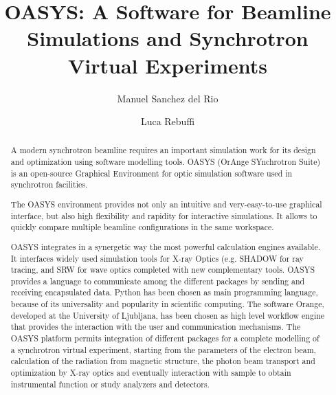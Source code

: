 \documentclass{aip-cp}
\begin{document}
\title{OASYS: A Software for Beamline Simulations and Synchrotron Virtual Experiments}

\author[aff1]{Manuel Sanchez del Rio} %
\author[aff2]{Luca Rebuffi}


\maketitle


\begin{abstract}
A modern synchrotron beamline requires an important simulation work for its design and optimization using software modelling tools. OASYS (OrAnge SYnchrotron Suite) is an open-source Graphical Environment for optic simulation software used in synchrotron facilities.

The OASYS environment provides not only an intuitive and very-easy-to-use graphical interface, but also high flexibility and rapidity for interactive simulations. It allows to quickly compare multiple beamline configurations in the same workspace. 

OASYS integrates in a synergetic way the most powerful calculation engines available. It interfaces widely used simulation tools for X-ray Optics (e.g. SHADOW for ray tracing, and SRW for wave optics completed with new complementary tools. OASYS provides a language to communicate among the different packages by sending and receiving encapsulated data. Python has been chosen as main programming language, because of its universality and popularity in scientific computing. The software Orange, developed at the University of Ljubljana, has been chosen as high level workflow engine that provides the interaction with the user and communication mechanisms. The OASYS platform permits integration of different packages for a complete modelling of a synchrotron virtual experiment, starting from the parameters of the electron beam, calculation of the radiation from magnetic structure, the photon beam transport and optimization by X-ray optics and eventually interaction with sample to obtain instrumental function or study analyzers and detectors. 
\end{abstract}
\end{document}
